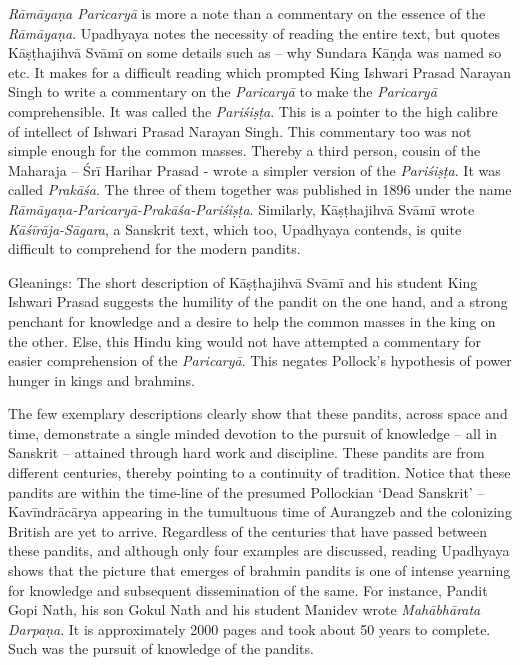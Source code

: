 \begin{enumerate}
\vspace{0.1cm}

 \textit{Rāmāyaṇa Paricaryā} is more a note than a commentary on the essence of the \textit{Rāmāyaṇa}. Upadhyaya notes the necessity of reading the entire text, but quotes Kāṣṭhajihvā Svāmī on some details such as – why Sundara Kāṇḍa was named so etc. It makes for a difficult reading which prompted King Ishwari Prasad Narayan Singh to write a commentary on the \textit{Paricaryā} to make the \textit{Paricaryā} comprehensible. It was called the \textit{Pariśiṣṭa}. This is a pointer to the high calibre of intellect of Ishwari Prasad Narayan Singh. This commentary too was not simple enough for the common masses. Thereby a third person, cousin of the Maharaja – Śrī Harihar Prasad - wrote a simpler version of the \textit{Pariśiṣṭa}. It was called \textit{Prakāśa}. The three of them together was published in 1896 under the name \textit{Rāmāyaṇa-Paricaryā-Prakāśa-Pariśiṣṭa}. Similarly, Kāṣṭhajihvā Svāmī wrote \textit{Kāśīrāja-Sāgara}, a Sanskrit text, which too, Upadhyaya contends, is quite difficult to comprehend for the modern pandits.

\vspace{0.1cm}

 Gleanings: The short description of Kāṣṭhajihvā Svāmī and his student King Ishwari Prasad suggests the humility of the pandit on the one hand, and a strong penchant for knowledge and a desire to help the common masses in the king on the other. Else, this Hindu king would not have attempted a commentary for easier comprehension of the \textit{Paricaryā}. This negates Pollock’s hypothesis of power hunger in kings and brahmins.

\vspace{0.1cm}

 The few exemplary descriptions clearly show that these pandits, across space and time, demonstrate a single minded devotion to the pursuit of knowledge – all in Sanskrit – attained through hard work and discipline. These pandits are from different centuries, thereby pointing to a continuity of tradition. Notice that these pandits are within the time-line of the presumed Pollockian ‘Dead Sanskrit’ – Kavīndrācārya appearing in the tumultuous time of Aurangzeb and the colonizing British are yet to arrive. Regardless of the centuries that have passed between these pandits, and although only four examples are discussed, reading Upadhyaya shows that the picture that emerges of brahmin pandits is one of intense yearning for knowledge and subsequent dissemination of the same. For instance, Pandit Gopi Nath, his son Gokul Nath and his student Manidev wrote \textit{Mahābhārata Darpaṇa}. It is approximately 2000 pages and took about 50 years to complete. Such was the pursuit of knowledge of the pandits.


\end{enumerate}
